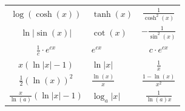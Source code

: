 \documentclass[a4paper,10pt]{article}
\begin{document}
\begin{center}
\begin{tabularx}{\linewidth}{c>{\centering\arraybackslash}Xc}
            $\log(\cosh(x))$                       & $\tanh(x)$               & $\frac{1}{\cosh^2(x)}$         \\
            $\ln | \sin(x)|$                       & $\cot(x)$                & $-\frac{1}{\sin^2(x)}$         \\
            $\frac{1}{c} \cdot e^{cx}$             & $e^{cx}$                 & $c \cdot e^{cx}$               \\
            $x(\ln |x| - 1)$                       & $\ln |x|$                & $\frac{1}{x}$                  \\
            $\frac{1}{2}(\ln(x))^2$                & $\frac{\ln(x)}{x}$       & $\frac{1 - \ln(x)}{x^2}$       \\
            $\frac{x}{\ln(a)} (\ln|x| -1)$         & $\log_a |x|$             & $\frac{1}{\ln(a)x}$            \\
            \bottomrule
        \end{tabularx}
    \end{center}
\end{document}
